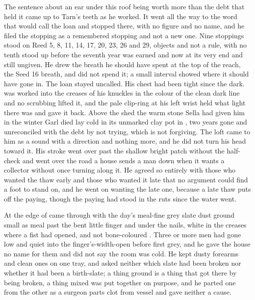 The sentence about an ear under this roof being worth more than the debt that held it came up to Tarn's teeth as he worked. It went all the way to the word that would call the loan and stopped there, with no figure and no name, and he filed the stopping as a remembered stopping and not a new one. Nine stoppings stood on Reed 5, 8, 11, 14, 17, 20, 23, 26 and 29, objects and not a rule, with no tenth stood up before the seventh year was earned and now at its very end and still ungiven. He drew the breath he should have spent at the top of the reach, the Seed 16 breath, and did not spend it; a small interval showed where it should have gone in. The loan stayed uncalled. His chest had been tight since the dark.  was worked into the creases of his knuckles in the colour of the clean dark line and no scrubbing lifted it, and the pale clip-ring at his left wrist held what light there was and gave it back. Above the shed the warm stone Sella had given him in the winter Garl died lay cold in its unmarked clay pot in , two years gone and unreconciled with the debt by not trying, which is not forgiving. The loft came to him as a sound with a direction and nothing more, and he did not turn his head toward it. His stroke went over  past the shallow bright patch without the half-check and went over the road a house sends a man down when it wants a collector without once turning along it. He agreed so entirely with those who wanted the thaw early and those who wanted it late that no argument could find a foot to stand on, and he went on wanting the late one, because a late thaw puts off the paying, though the paying had stood in the ruts since the water went.

\scenebreak

At the edge of   came through with the day's meal-fine grey slate dust ground small as meal past the bent little finger and under the nails, white in the creases where a fist had opened, and not bone-coloured . Three or more men had gone low and quiet into the finger's-width-open  before first grey, and he gave the house no name for them and did not say the room was cold. He kept dusty forearms and clean ones on one tray, and asked neither which slate had been broken nor whether it had been a birth-slate; a thing ground is a thing that got there by being broken, a thing mixed was put together on purpose, and he parted one from the other as a surgeon parts clot from vessel and gave neither a cause.

